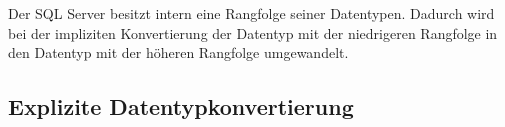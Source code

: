         \begin{merke}
            Der SQL Server besitzt intern eine Rangfolge seiner Datentypen. Dadurch wird bei der impliziten Konvertierung der Datentyp mit der niedrigeren Rangfolge in den Datentyp mit der h\"oheren Rangfolge umgewandelt.
        \end{merke}
        \begin{literaturinternet}
          \item \cite{autoId8}
          \item \cite{ms191530}
          \item \cite{ms190309}
        \end{literaturinternet}
      \subsection{Explizite Datentypkonvertierung}
